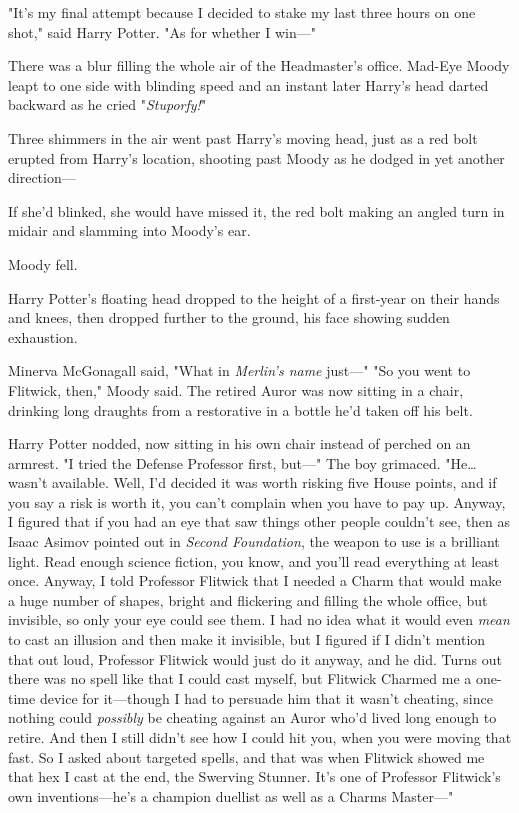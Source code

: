 "It's my final attempt because I decided to stake my last three hours on one shot," said Harry Potter. "As for whether I win---"

There was a blur filling the whole air of the Headmaster's office. Mad-Eye Moody leapt to one side with blinding speed and an instant later Harry's head darted backward as he cried "\emph{Stuporfy!}"

Three shimmers in the air went past Harry's moving head, just as a red bolt erupted from Harry's location, shooting past Moody as he dodged in yet another direction---

If she'd blinked, she would have missed it, the red bolt making an angled turn in midair and slamming into Moody's ear.

Moody fell.

Harry Potter's floating head dropped to the height of a first-year on their hands and knees, then dropped further to the ground, his face showing sudden exhaustion.

Minerva McGonagall said, "What in \emph{Merlin's name} just---"
\sbreak
"So you went to Flitwick, then," Moody said. The retired Auror was now sitting in a chair, drinking long draughts from a restorative in a bottle he'd taken off his belt.

Harry Potter nodded, now sitting in his own chair instead of perched on an armrest. "I tried the Defense Professor first, but---" The boy grimaced. "He{\ldots} wasn't available. Well, I'd decided it was worth risking five House points, and if you say a risk is worth it, you can't complain when you have to pay up. Anyway, I figured that if you had an eye that saw things other people couldn't see, then as Isaac Asimov pointed out in \emph{Second Foundation}, the weapon to use is a brilliant light. Read enough science fiction, you know, and you'll read everything at least once. Anyway, I told Professor Flitwick that I needed a Charm that would make a huge number of shapes, bright and flickering and filling the whole office, but invisible, so only your eye could see them. I had no idea what it would even \emph{mean} to cast an illusion and then make it invisible, but I figured if I didn't mention that out loud, Professor Flitwick would just do it anyway, and he did. Turns out there was no spell like that I could cast myself, but Flitwick Charmed me a one-time device for it---though I had to persuade him that it wasn't cheating, since nothing could \emph{possibly} be cheating against an Auror who'd lived long enough to retire. And then I still didn't see how I could hit you, when you were moving that fast. So I asked about targeted spells, and that was when Flitwick showed me that hex I cast at the end, the Swerving Stunner. It's one of Professor Flitwick's own inventions---he's a champion duellist as well as a Charms Master---"

